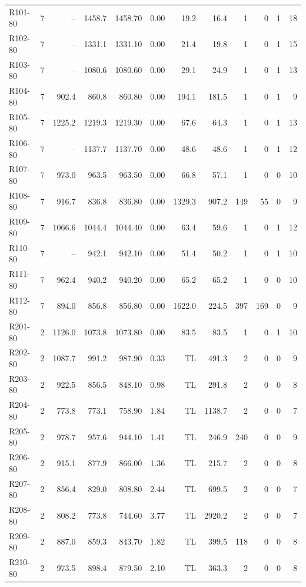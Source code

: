 \documentclass[10pt]{article}
\begin{document}
\begin{table}[p]
\begin{tabular}{lrrrrrrrrrrr}
\midrule
R101-80 & 7 & -- & 1458.7 & 1458.70 & 0.00 & 19.2 & 16.4 & 1 & 0 & 1 & 18 \\
R102-80 & 7 & -- & 1331.1 & 1331.10 & 0.00 & 21.4 & 19.8 & 1 & 0 & 1 & 15 \\
R103-80 & 7 & -- & 1080.6 & 1080.60 & 0.00 & 29.1 & 24.9 & 1 & 0 & 1 & 13 \\
R104-80 & 7 & 902.4 & 860.8 & 860.80 & 0.00 & 194.1 & 181.5 & 1 & 0 & 1 & 9 \\
R105-80 & 7 & 1225.2 & 1219.3 & 1219.30 & 0.00 & 67.6 & 64.3 & 1 & 0 & 1 & 13 \\
R106-80 & 7 & -- & 1137.7 & 1137.70 & 0.00 & 48.6 & 48.6 & 1 & 0 & 1 & 12 \\
R107-80 & 7 & 973.0 & 963.5 & 963.50 & 0.00 & 66.8 & 57.1 & 1 & 0 & 0 & 10 \\
R108-80 & 7 & 916.7 & 836.8 & 836.80 & 0.00 & 1329.3 & 907.2 & 149 & 55 & 0 & 9 \\
R109-80 & 7 & 1066.6 & 1044.4 & 1044.40 & 0.00 & 63.4 & 59.6 & 1 & 0 & 1 & 12 \\
R110-80 & 7 & -- & 942.1 & 942.10 & 0.00 & 51.4 & 50.2 & 1 & 0 & 1 & 10 \\
R111-80 & 7 & 962.4 & 940.2 & 940.20 & 0.00 & 65.2 & 65.2 & 1 & 0 & 0 & 10 \\
R112-80 & 7 & 894.0 & 856.8 & 856.80 & 0.00 & 1622.0 & 224.5 & 397 & 169 & 0 & 9 \\
\midrule
R201-80 & 2 & 1126.0 & 1073.8 & 1073.80 & 0.00 & 83.5 & 83.5 & 1 & 0 & 1 & 10 \\
R202-80 & 2 & 1087.7 & 991.2 & 987.90 & 0.33 & TL & 491.3 & 2 & 0 & 0 & 9 \\
R203-80 & 2 & 922.5 & 856.5 & 848.10 & 0.98 & TL & 291.8 & 2 & 0 & 0 & 8 \\
R204-80 & 2 & 773.8 & 773.1 & 758.90 & 1.84 & TL & 1138.7 & 2 & 0 & 0 & 7 \\
R205-80 & 2 & 978.7 & 957.6 & 944.10 & 1.41 & TL & 246.9 & 240 & 0 & 0 & 9 \\
R206-80 & 2 & 915.1 & 877.9 & 866.00 & 1.36 & TL & 215.7 & 2 & 0 & 0 & 8 \\
R207-80 & 2 & 856.4 & 829.0 & 808.80 & 2.44 & TL & 699.5 & 2 & 0 & 0 & 7 \\
R208-80 & 2 & 808.2 & 773.8 & 744.60 & 3.77 & TL & 2920.2 & 2 & 0 & 0 & 7 \\
R209-80 & 2 & 887.0 & 859.3 & 843.70 & 1.82 & TL & 399.5 & 118 & 0 & 0 & 8 \\
R210-80 & 2 & 973.5 & 898.4 & 879.50 & 2.10 & TL & 363.3 & 2 & 0 & 0 & 8 \\

\end{tabular}
\end{table}
\end{document}
